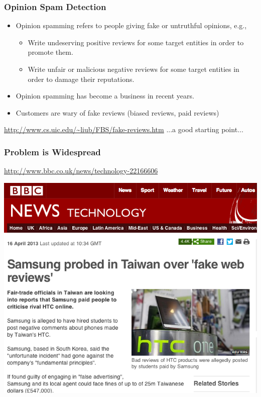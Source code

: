 \documentclass[t]{beamer}
\begin{document}
\begin{frame} \frametitle{Opinion Spam Detection} %


\begin{itemize}
\item Opinion spamming refers to people giving fake or untruthful opinions,
e.g., \\
\begin{itemize}
\item Write undeserving positive reviews for some target entities in order
to promote them. 
\item Write unfair or malicious negative reviews for some target entities in order to damage their reputations.
\end{itemize}

\item Opinion spamming has become a business in recent years. 

\item Customers are wary of fake reviews (biased reviews, paid reviews)

\end{itemize}

\begin{block}{\url{http://www.cs.uic.edu/~liub/FBS/fake-reviews.htm}} 
...a good starting point...
\end{block}


\end{frame}

\begin{frame} \frametitle{Problem is Widespread} %


\begin{block}{\url{http://www.bbc.co.uk/news/technology-22166606}} 

\begin{center}
     \includegraphics[width=\textwidth]{samsung-spam}
\end{center}

\end{block}


\end{frame}
\end{document}
